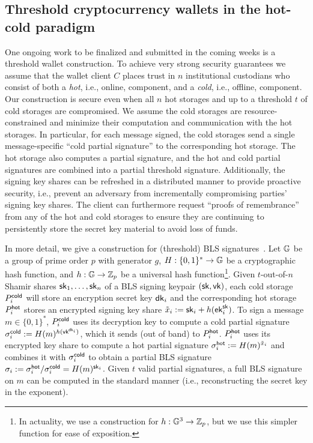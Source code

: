 \subsection{Threshold cryptocurrency wallets in the hot-cold paradigm}\label{sec:ksp}

One ongoing work to be finalized and submitted in the coming weeks is a threshold wallet construction. To achieve very strong security guarantees we assume that the wallet client $C$ places trust in $n$ institutional custodians who consist of both a \emph{hot}, i.e., online, component, and a \emph{cold}, i.e., offline, component. Our construction is secure even when all $n$ hot storages and up to a threshold $t$ of cold storages are compromised. We assume the cold storages are resource-constrained and minimize their computation and communication with the hot storages. In particular, for each message signed, the cold storages send a single message-specific ``cold partial signature'' to the corresponding hot storage. The hot storage also computes a partial signature, and the hot and cold partial signatures are combined into a partial threshold signature. Additionally, the signing key shares can be refreshed in a distributed manner to provide proactive security, i.e., prevent an adversary from incrementally compromising parties' signing key shares. The client can furthermore request ``proofs of remembrance'' from any of the hot and cold storages to ensure they are continuing to persistently store the secret key material to avoid loss of funds.

In more detail, we give a construction for (threshold) BLS signatures~\cite{AC:BonLynSha01}. Let $\mathbb{G}$ be a group of prime order $p$ with generator $g$, $H: \{0,1\}^* \to \mathbb{G}$ be a cryptographic hash function, and $h: \mathbb{G} \to \mathbb{Z}_p$ be a universal hash function\footnote{In actuality, we use a construction for $h: \mathbb{G}^3 \to \mathbb{Z}_p$, but we use this simpler function for ease of exposition.}.
Given $t$-out-of-$n$ Shamir shares $\mathsf{sk}_1, \dots, \mathsf{sk}_n$ of a BLS signing keypair $(\mathsf{sk}, \mathsf{vk})$, each cold storage $P_i^{\mathsf{cold}}$ will store an encryption secret key $\mathsf{dk}_i$ and the corresponding hot storage $P_i^{\mathsf{hot}}$ stores an encrypted signing key share $\tilde{x}_i := \mathsf{sk}_i + h(\mathsf{ek}_i^{\mathsf{sk}})$. To sign a message $m \in \{0,1\}^*$, $P_i^{\mathsf{cold}}$ uses its decryption key to compute a cold partial signature $\sigma_i^{\mathsf{cold}} := H(m)^{h(\mathsf{vk}^{\mathsf{dk}_i})}$, which it sends (out of band) to $P_i^{\mathsf{hot}}$. $P_i^{\mathsf{hot}}$ uses its encrypted key share to compute a hot partial signature $\sigma_i^{\mathsf{hot}} := H(m)^{\tilde{x}_i}$ and combines it with $\sigma_i^{\mathsf{cold}}$ to obtain a partial BLS signature $\sigma_i := \sigma_i^{\mathsf{hot}} / \sigma_i^{\mathsf{cold}} = H(m)^{\mathsf{sk}_i}$. Given $t$ valid partial signatures, a full BLS signature on $m$ can be computed in the standard manner (i.e., reconstructing the secret key in the exponent).

